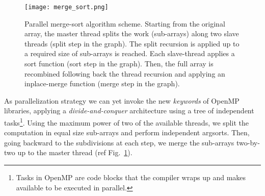 \documentclass{standalone}
\begin{document}
\begin{figure}[htbp]
\centering
\texttt{[image: merge\_sort.png]}
\caption{Parallel merge-sort algorithm scheme.
Starting from the original array, the master thread splits the work (sub-arrays) along two slave threads (\textsf{split} step in the graph).
The split recursion is applied up to a required size of sub-arrays is reached.
Each slave-thread applies a sort function (\textsf{sort} step in the graph).
Then, the full array is recombined following back the thread recursion and applying an \textsf{inplace-merge} function (\textsf{merge} step in the graph).
}
\label{fig:merge_sort}
\end{figure}

As parallelization strategy we can yet invoke the new \emph{keywords} of OpenMP libraries, applying a \emph{divide-and-conquer} architecture using a tree of independent \textsf{tasks}\footnote{
  Tasks in OpenMP are code blocks that the compiler wraps up and makes available to be executed in parallel.
}.
Using the maximum power of two of the available threads, we split the computation in equal size sub-arrays and perform independent \textsf{argsort}s.
Then, going backward to the subdivisions at each step, we merge the sub-arrays two-by-two up to the master thread (ref Fig.~\ref{fig:merge_sort}).
\end{document}
